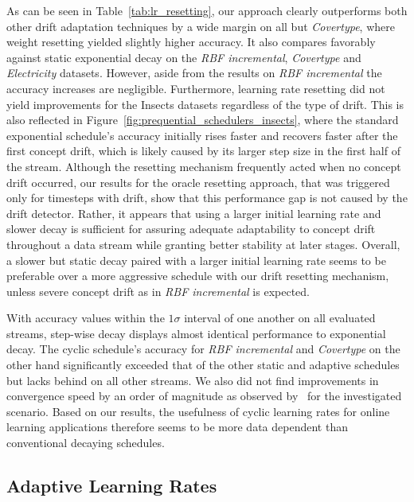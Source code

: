 \documentclass[runningheads]{llncs}
\begin{document}
As can be seen in Table~\ref{tab:lr_resetting}, our approach clearly outperforms both other drift adaptation techniques by a wide margin on all but \textit{Covertype}, where weight resetting yielded slightly higher accuracy.
It also compares favorably against static exponential decay on the \textit{RBF incremental}, \textit{Covertype} and \textit{Electricity} datasets.
However, aside from the results on \textit{RBF incremental} the accuracy increases are negligible.
Furthermore, learning rate resetting did not yield improvements for the Insects datasets regardless of the type of drift.
This is also reflected in Figure~\ref{fig:prequential_schedulers_insects}, where the standard exponential schedule's accuracy initially rises faster and recovers faster after the first concept drift, which is likely caused by its larger step size in the first half of the stream.
Although the resetting mechanism frequently acted when no concept drift occurred, our results for the oracle resetting approach, that was triggered only for timesteps with drift, show that this performance gap is not caused by the drift detector.
Rather, it appears that using a larger initial learning rate and slower decay is sufficient for assuring adequate adaptability to concept drift throughout a data stream while granting better stability at later stages.
Overall, a slower but static decay paired with a larger initial learning rate seems to be preferable over a more aggressive schedule with our drift resetting mechanism, unless severe concept drift as in \textit{RBF incremental} is expected.

With accuracy values within the $1\sigma$ interval of one another on all evaluated streams, step-wise decay displays almost identical performance to exponential decay.
The cyclic schedule's accuracy for \textit{RBF incremental} and \textit{Covertype} on the other hand significantly exceeded that of the other static and adaptive schedules but lacks behind on all other streams.
We also did not find improvements in convergence speed by an order of magnitude as observed by~\cite{smithSuperConvergenceVeryFast2018a} for the investigated scenario.
Based on our results, the usefulness of cyclic learning rates for online learning applications therefore seems to be more data dependent than conventional decaying schedules.

\subsection{Adaptive Learning Rates}
\end{document}
